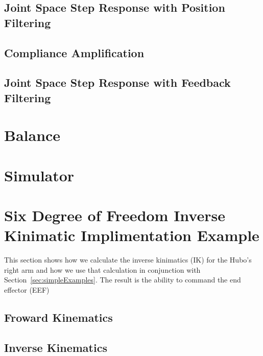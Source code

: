 	\subsection{Joint Space Step Response with Position Filtering}\label{sec:singlejointFilter}
		
	\subsection{Compliance Amplification}\label{sec:singlejointRefComplience}
		
	\subsection{Joint Space Step Response with Feedback Filtering}\label{sec:singlejointEnc}
		

\section{Balance}

\section{Simulator}\label{sec:simulator}
	


\section{Six Degree of Freedom Inverse Kinimatic Implimentation Example}\label{sec:6dofik}
This section shows how we calculate the inverse kinimatics (IK) for the Hubo's right arm and how we use that calculation in conjunction with Section~\ref{sec:simpleExamples}.  The result is the ability to command the end effector (EEF)


	\subsection{Froward Kinematics} 
		
	\subsection{Inverse Kinematics}\label{sec:ik}
			





